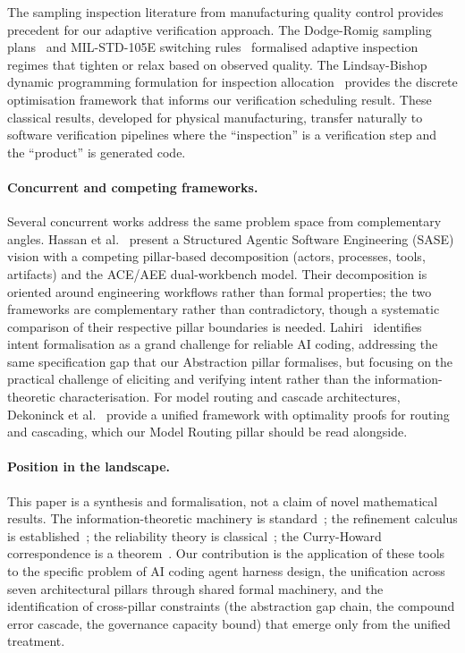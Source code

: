 \documentclass[11pt, a4paper]{googledeepmind}
\begin{document}
The sampling inspection literature from manufacturing quality control provides precedent for our adaptive verification approach. The Dodge-Romig sampling plans~\citep{dodge1929method, dodge1959sampling} and MIL-STD-105E switching rules~\citep{milstd105e} formalised adaptive inspection regimes that tighten or relax based on observed quality. The Lindsay-Bishop dynamic programming formulation for inspection allocation~\citep{lindsay1964allocation} provides the discrete optimisation framework that informs our verification scheduling result. These classical results, developed for physical manufacturing, transfer naturally to software verification pipelines where the ``inspection'' is a verification step and the ``product'' is generated code.

\paragraph{Concurrent and competing frameworks.}
Several concurrent works address the same problem space from complementary angles. Hassan et al.~\citep{hassan2025agentic} present a Structured Agentic Software Engineering (SASE) vision with a competing pillar-based decomposition (actors, processes, tools, artifacts) and the ACE/AEE dual-workbench model. Their decomposition is oriented around engineering workflows rather than formal properties; the two frameworks are complementary rather than contradictory, though a systematic comparison of their respective pillar boundaries is needed. Lahiri~\citep{lahiri2026intent} identifies intent formalisation as a grand challenge for reliable AI coding, addressing the same specification gap that our Abstraction pillar formalises, but focusing on the practical challenge of eliciting and verifying intent rather than the information-theoretic characterisation. For model routing and cascade architectures, Dekoninck et al.~\citep{dekoninck2025cascade} provide a unified framework with optimality proofs for routing and cascading, which our Model Routing pillar should be read alongside.

\paragraph{Position in the landscape.}
This paper is a synthesis and formalisation, not a claim of novel mathematical results. The information-theoretic machinery is standard~\citep{li2019introduction}; the refinement calculus is established~\citep{back1980correctness, morgan1994programming}; the reliability theory is classical~\citep{barlow1965mathematical}; the Curry-Howard correspondence is a theorem~\citep{wadler2015propositions}. Our contribution is the application of these tools to the specific problem of AI coding agent harness design, the unification across seven architectural pillars through shared formal machinery, and the identification of cross-pillar constraints (the abstraction gap chain, the compound error cascade, the governance capacity bound) that emerge only from the unified treatment.
\end{document}
